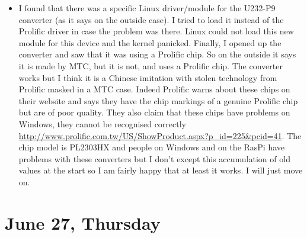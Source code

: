 \documentclass[a4paper,12pt]{article}
\begin{document}
\begin{itemize}
	\item I found that there was a specific Linux driver/module for the U232-P9 converter (as it says on the outside case). I tried to load it instead of the Prolific driver in case the problem was there. Linux could not load this new module for this device and the kernel panicked. Finally, I opened up the converter and saw that it was using a Prolific chip. So on the outside it says it is made by MTC, but it is not, and uses a Prolific chip. The converter works but I think it is a Chinese imitation with stolen technology from Prolific masked in a MTC case. Indeed Prolific warns about these chips on their website and says they have the chip markings of a genuine Prolific chip but are of poor quality. They also claim that these chips have problems on Windows, they cannot be recognised correctly \url{http://www.prolific.com.tw/US/ShowProduct.aspx?p_id=225&pcid=41}. The chip model is PL2303HX and people on Windows and on the RasPi have problems with these converters but I don't except this accumulation of old values at the start so I am fairly happy that at least it works. I will just move on.
\end{itemize}

\section{June 27, Thursday}
\end{document}
